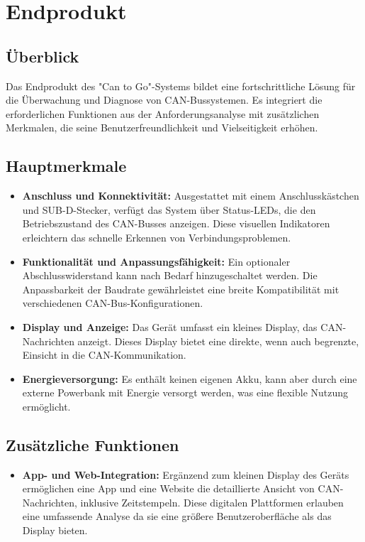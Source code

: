 \section{Endprodukt}

\subsection{Überblick}
\noindent Das Endprodukt des "Can to Go"-Systems bildet eine fortschrittliche Lösung für die Überwachung und Diagnose von CAN-Bussystemen. Es integriert die erforderlichen Funktionen aus der Anforderungsanalyse mit zusätzlichen Merkmalen, die seine Benutzerfreundlichkeit und Vielseitigkeit erhöhen.\\

\subsection{Hauptmerkmale}
\begin{itemize}
    \item \textbf{Anschluss und Konnektivität:} Ausgestattet mit einem Anschlusskästchen und SUB-D-Stecker, verfügt das System über Status-LEDs, die den Betriebszustand des CAN-Busses anzeigen. Diese visuellen Indikatoren erleichtern das schnelle Erkennen von Verbindungsproblemen.
    
    \item \textbf{Funktionalität und Anpassungsfähigkeit:} Ein optionaler Abschlusswiderstand kann nach Bedarf hinzugeschaltet werden. Die Anpassbarkeit der Baudrate gewährleistet eine breite Kompatibilität mit verschiedenen CAN-Bus-Konfigurationen.
    
    \item \textbf{Display und Anzeige:} Das Gerät umfasst ein kleines Display, das CAN-Nachrichten anzeigt. Dieses Display bietet eine direkte, wenn auch begrenzte, Einsicht in die CAN-Kommunikation.
    
    \item \textbf{Energieversorgung:} Es enthält keinen eigenen Akku, kann aber durch eine externe Powerbank mit Energie versorgt werden, was eine flexible Nutzung ermöglicht.
\end{itemize}   

\subsection{Zusätzliche Funktionen}
\begin{itemize}
 \item \textbf{App- und Web-Integration:} Ergänzend zum kleinen Display des Geräts ermöglichen eine App und eine Website die detaillierte Ansicht von CAN-Nachrichten, inklusive Zeitstempeln. Diese digitalen Plattformen erlauben eine umfassende Analyse da sie eine größere Benutzeroberfläche als das Display bieten.
\end{itemize}   


